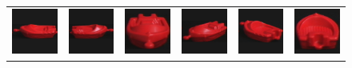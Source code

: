 \begin{figure}[p]
\begin{tabular}{cccccc}
\includegraphics[width=2cm]{coil/beeld-18.eps} &
\includegraphics[width=2cm]{coil/beeld-19.eps} &
\includegraphics[width=2cm]{coil/beeld-20.eps} &
\includegraphics[width=2cm]{coil/beeld-21.eps} &
\includegraphics[width=2cm]{coil/beeld-22.eps} &
\includegraphics[width=2cm]{coil/beeld-23.eps} \\


\end{tabular}
\end{figure}
